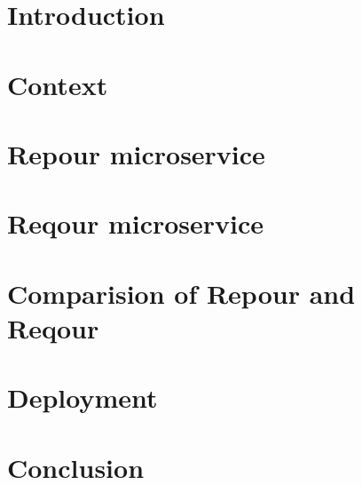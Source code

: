 \documentclass[
  digital,     %
  oneside,     %
  nosansbold,  %
  nocolorbold, %
  nolof,         %
  nolot,         %
]{fithesis4}
\begin{document}
\chapter*{Introduction}
\label{chap:introduction}


\chapter{Context}
\label{chap:context}


\chapter{Repour microservice}
\label{chap:repour}


\chapter{Reqour microservice}
\label{chap:reqour}


\chapter{Comparision of Repour and Reqour}
\label{chap:comparision}


\chapter{Deployment}
\label{chap:deployment}


\chapter*{Conclusion}
\label{chap:conclusion}

\end{document}
